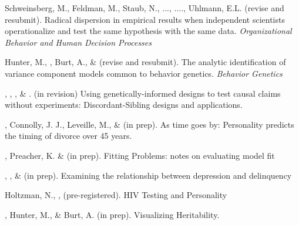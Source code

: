 \item Schweinsberg, M., Feldman, M., Staub, N., ..., \meb ...., Uhlmann, E.L. (revise and resubmit). Radical dispersion in empirical results when independent scientists operationalize and test the same hypothesis with the same data. \textit{Organizational Behavior and Human Decision Processes}

\item Hunter, M., \meb, Burt, A., \& \joe (revise and resubmit). The analytic identification of variance component models common to behavior genetics. \textit{Behavior Genetics}


\item \meb, \jt, \yrh, \& \joe. (in revision) Using genetically-informed designs to test causal claims without experiments: Discordant-Sibling designs and applications. \href{https://osf.io/zpdwt/}{\small\color{blue}{osf.io/zpdwt/}}%

\item \meb, Connolly, J. J., Leveille, M., \& \jjj (in prep). As time goes by: Personality predicts the timing of divorce over 45 years.%

\item \meb, Preacher, K. \& \joe (in prep). Fitting Problems: notes on evaluating model fit
%
\item \emsims, \jt, \& \meb (in prep). Examining the relationship between depression and delinquency



\item Holtzman, N., \meb, \etal (pre-registered). HIV Testing and Personality


\item \meb, Hunter, M., \& Burt, A. (in prep). Visualizing Heritability.



